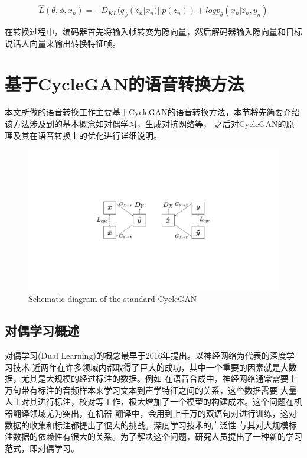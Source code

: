 \begin{equation}
    \hat{L}(\theta,\phi,x_n)=-D_{KL}(q_{\phi}(\hat{z}_n|x_n)||p(z_n))+logp_{\theta}(x_n|\hat{z}_n,y_n)
\end{equation}

在转换过程中，编码器首先将输入帧转变为隐向量，然后解码器输入隐向量和目标说话人向量来输出转换特征帧。


\section{基于CycleGAN的语音转换方法}
本文所做的语音转换工作主要基于CycleGAN的语音转换方法，本节将先简要介绍该方法涉及到的基本概念如对偶学习，生成对抗网络等，
之后对CycleGAN的原理及其在语音转换上的优化进行详细说明。

\begin{figure}[!htp]
    \centering
    \includegraphics[width=13cm,trim=100 120 100 120,clip]{figure/3_cyclegan.pdf}
    {Schematic diagram of the standard CycleGAN}
    \label{fig:cyclegan}
\end{figure}

\subsection{对偶学习概述}
对偶学习(Dual Learning)的概念最早于2016年提出\cite{he2016dual}。以神经网络为代表的深度学习技术
近两年在许多领域内都取得了巨大的成功，其中一个重要的因素就是大数据，尤其是大规模的经过标注的数据。例如
在语音合成中，神经网络通常需要上万句带有标注的音频样本来学习文本到声学特征之间的关系，这些数据需要
大量人工对其进行标注，校对等工作，极大增加了一个模型的构建成本。这个问题在机器翻译领域尤为突出，在机器
翻译中，会用到上千万的双语句对进行训练，这对数据的收集和标注都提出了很大的挑战。深度学习技术的广泛性
与其对大规模标注数据的依赖性有很大的关系。为了解决这个问题，研究人员提出了一种新的学习范式，即对偶学习。

